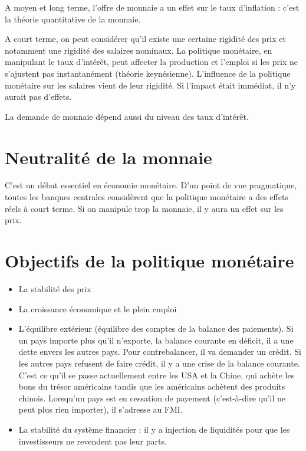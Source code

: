 	A moyen et long terme, l'offre de monnaie a un effet sur le taux d'inflation : c'est la théorie quantitative de la monnaie.

	A court terme, on peut considérer qu'il existe une certaine rigidité des prix et notamment une rigidité des salaires nominaux. La politique monétaire, en manipulant le taux d'intérêt, peut affecter la production et l'emploi si les prix ne s'ajustent pas instantanément (théorie keynésienne). L'influence de la politique monétaire sur les salaires vient de leur rigidité. Si l'impact était immédiat, il n'y aurait pas d'effets.

	La demande de monnaie dépend aussi du niveau des taux d'intérêt.
	
\section{Neutralité de la monnaie}

C'est un débat essentiel en économie monétaire. D'un point de vue pragmatique, toutes les banques centrales considèrent que la politique monétaire a des effets réels à court terme. Si on manipule trop la monnaie, il y aura un effet sur les prix.

\section{Objectifs de la politique monétaire}

\begin{itemize}
	\item La stabilité des prix
	\item La croissance économique et le plein emploi
	\item L'équilibre extérieur (équilibre des comptes de la balance des paiements). Si un pays importe plus qu'il n'exporte, la balance courante en déficit, il a une dette envers les autres pays. Pour contrebalancer, il va demander un crédit. Si les autres pays refusent de faire crédit, il y a une crise de la balance courante. C'est ce qu'il se passe actuellement entre les USA et la Chine, qui achète les bons du trésor américains tandis que les américains achètent des produits chinois. Lorsqu'un pays est en cessation de payement (c'est-à-dire qu'il ne peut plus rien importer), il s'adresse au FMI.
	\item La stabilité du système financier : il y a injection de liquidités pour que les investisseurs ne revendent pas leur parts.
\end{itemize}

